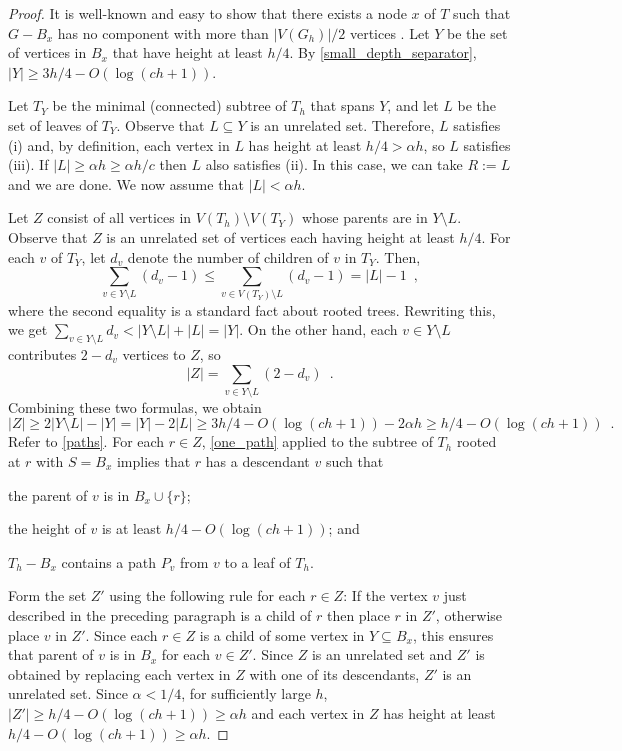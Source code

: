 \documentclass{patmorin}
\renewcommand{\le}{\leqslant}
\renewcommand{\ge}{\geqslant}
\begin{document}
\begin{proof}
  It is well-known and easy to show that there exists a node $x$ of $T$ such that $G-B_x$ has no component with more than $|V(G_h)|/2$ vertices \cite[(2.6)]{robertson.seymour:graph}. Let $Y$ be the set of vertices in $B_x$ that have height at least $h/4$.  By \cref{small_depth_separator}, $|Y|\ge 3h/4 - O(\log (ch+1))$.

  Let $T_Y$ be the minimal (connected) subtree of $T_h$ that spans $Y$, and let $L$ be the set of leaves of $T_Y$.  Observe that $L\subseteq Y$ is an unrelated set. Therefore, $L$ satisfies (i) and, by definition, each vertex in $L$ has height at least $h/4 > \alpha h$, so $L$ satisfies (iii).  If $|L|\ge \alpha h \ge \alpha h/c$ then $L$ also satisfies (ii).  In this case, we can take $R:=L$ and we are done.  We now assume that $|L|< \alpha h$.

  Let $Z$ consist of all vertices in $V(T_h)\setminus V(T_Y)$ whose parents are in $Y\setminus L$.   Observe that $Z$ is an unrelated set of vertices each having height at least $h/4$. For each $v$ of $T_Y$, let $d_v$ denote the number of children of $v$ in $T_Y$.  Then,
  \[
     \sum_{v\in Y\setminus L} (d_v-1)
     \le \sum_{v\in V(T_Y)\setminus L} (d_v-1)
     = |L|-1 \enspace ,
  \]
  where the second equality is a standard fact about rooted trees.
  Rewriting this, we get $\sum_{v\in Y\setminus L} {d_v} < |Y\setminus L| + |L| = |Y|$.  On the other hand, each $v\in Y\setminus L$ contributes $2-d_v$ vertices to $Z$, so
  \[
    |Z| = \sum_{v\in Y\setminus L} (2-d_v) \enspace .
  \]
  Combining these two formulas, we obtain
  \[
    |Z| \ge 2|Y\setminus L| - |Y| = |Y| - 2|L|
    \ge 3h/4-O(\log(ch+1)) - 2\alpha h
    \ge h/4-O(\log(ch+1)) \enspace .
  \]
  Refer to \cref{paths}.  For each $r\in Z$, \cref{one_path} applied to the subtree of $T_h$ rooted at $r$ with $S=B_x$ implies that $r$ has a descendant $v$ such that
  \begin{inparaenum}[(a)]
    \item the parent of $v$ is in $B_x\cup\{r\}$;
    \item the height of $v$ is at least $h/4-O(\log(ch+1))$; and
    \item $T_h-B_x$ contains a path $P_{v}$ from $v$ to a leaf of $T_h$.
  \end{inparaenum}

  Form the set $Z'$ using the following rule for each $r\in Z$: If the vertex $v$ just described in the preceding paragraph is a child of $r$ then place $r$ in $Z'$, otherwise place $v$ in $Z'$. Since each $r\in Z$ is a child of some vertex in $Y\subseteq B_x$, this ensures that parent of $v$ is in $B_x$ for each $v\in Z'$.  Since $Z$ is an unrelated set and $Z'$ is obtained by replacing each vertex in $Z$ with one of its descendants, $Z'$ is an unrelated set.  Since $\alpha < 1/4$, for sufficiently large $h$, $|Z'|\ge h/4 - O(\log(ch+1)) \ge \alpha h$ and each vertex in $Z$ has height at least $h/4 - O(\log(ch+1)) \ge \alpha h$.


\end{proof}
\end{document}

